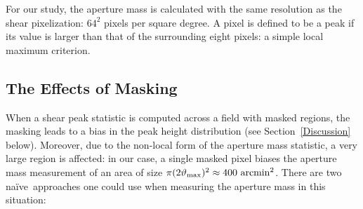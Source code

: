 \documentclass[twocolumn]{emulateapj}
\newcommand{\naive}{na\"{i}ve\ }
\begin{document}
For our study, the aperture mass is calculated with the same resolution as the
shear pixelization: $64^2$ pixels per square degree.  A pixel is defined to be
a peak if its value is larger than that of the surrounding eight pixels:
a simple local maximum criterion. 

\begin{figure*}
 \centering
 \caption{
   Comparison of the masked and unmasked peak distributions.
   \textit{left panel:} the peak distributions without the use of KL.
   The black line is the result with no masking, while the red and green
   lines show the two \naive methods of correcting for the mask (see
   Section~\ref{MaskingEffects}).
   \textit{right panel:}  the masked and unmasked peak distributions
   after applying KL. 
   Neither \naive method of mask-correction adequately recovers 
   the underlying peak distribution.  It is evident, however, that 
   the KL-based interpolation procedure recovers a mass map with 
   a similar peak distribution to the unmasked KL map.
   It should be noted that the unmasked peak distribution 
   (black line, left panel) is not identical to the unmasked peak distribution
   after application of KL (black line, right panel).  This difference is
   addressed in Figure~\ref{fig_num_peaks}.
   \label{fig_mask_nomask} 
 }
\end{figure*} 

\subsection{The Effects of Masking}
\label{MaskingEffects}
When a shear peak statistic is computed across a field with masked regions,
the masking leads to a bias in the peak height distribution
(see Section~\ref{Discussion} below).  Moreover, due
to the non-local form of the aperture mass statistic, a very large region is
affected: in our case, a single masked pixel biases the aperture mass 
measurement of an area of size
 $\pi(2\vartheta_{\rm max})^2 \approx 400\ {\rm arcmin}^2$.  
There are two \naive approaches one could use when measuring the 
aperture mass in this situation:
\end{document}
